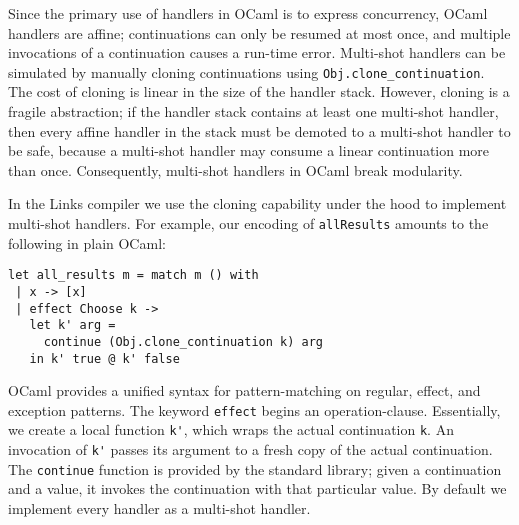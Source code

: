 \documentclass[12pt,mscres,cdtppar,twoside,openright,logo,rightchapter,normalheadings]{infthesis}
\theoremstyle{definition}
\begin{document}
Since the primary use of handlers in OCaml is to express concurrency,
OCaml handlers are affine; continuations can only be resumed at most
once, and multiple invocations of a continuation causes a run-time
error. Multi-shot handlers can be simulated by manually cloning
continuations using \lstinline$Obj.clone_continuation$. The cost of
cloning is linear in the size of the handler stack. However, cloning
is a fragile abstraction; if the handler stack contains at least one
multi-shot handler, then every affine handler in the stack must be
demoted to a multi-shot handler to be safe, because a multi-shot
handler may consume a linear continuation more than
once. Consequently, multi-shot handlers in OCaml break modularity.

In the Links compiler we use the cloning capability under the hood to implement
multi-shot handlers. For example, our encoding of \lstinline$allResults$
amounts to the following in plain OCaml:
\begin{lstlisting}[style=ocaml]
let all_results m = match m () with
 | x -> [x]
 | effect Choose k -> 
   let k' arg = 
     continue (Obj.clone_continuation k) arg 
   in k' true @ k' false
\end{lstlisting}
OCaml provides a unified syntax for pattern-matching on regular, effect, and
exception patterns. The keyword \lstinline[style=ocaml]$effect$ begins an
operation-clause. Essentially, we create a local function \lstinline$k'$, which
wraps the actual continuation \lstinline$k$. An invocation of \lstinline$k'$
passes its argument to a fresh copy of the actual continuation. The
\lstinline$continue$ function is provided by the standard library; given a
continuation and a value, it invokes the continuation with that particular
value. By default we implement every handler as a multi-shot handler.
\end{document}
